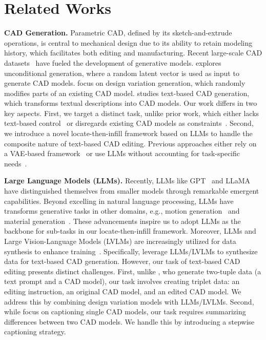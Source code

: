 \section{Related Works}
\label{related_work}  
\noindent\textbf{CAD Generation.}  
Parametric CAD, defined by its sketch-and-extrude operations, is central to mechanical design due to its ability to retain modeling history, which facilitates both editing and manufacturing. 
Recent large-scale CAD datasets~\citep{wu2021deepcad} have fueled the development of generative models.
\citet{wu2021deepcad} explores unconditional generation, where a random latent vector is used as input to generate CAD models. 
\citet{xu2022skexgen, xu2023hierarchical, zhang2024flexcad} focus on design variation generation, which randomly modifies parts of an existing CAD model. 
\citet{khan2024cad} studies text-based CAD generation, which transforms textual descriptions into CAD models.
Our work differs in two key aspects.
First, we target a distinct task, unlike prior work, which either lacks text-based control~\citep{wu2021deepcad, xu2022skexgen, xu2023hierarchical, zhang2024flexcad} or disregards existing CAD models as constraints~\citep{khan2024cad}.
Second, we introduce a novel locate-then-infill framework based on LLMs to handle the composite nature of text-based CAD editing.
Previous approaches either rely on a VAE-based framework~\citep{wu2021deepcad, xu2022skexgen, xu2023hierarchical} or use LLMs without accounting for task-specific needs~\citep{zhang2024flexcad,khan2024cad}.


\noindent\textbf{Large Language Models (LLMs).} 
Recently, LLMs like GPT~\citep{achiam2023gpt, OpenAI2023} and LLaMA~\citep{touvron2023llama} have distinguished themselves from smaller models through remarkable emergent capabilities. 
Beyond excelling in natural language processing, LLMs have transforms generative tasks in other domains, e.g., motion generation~\citep{zhang2024motiongpt} and material generation~\citep{gruverfine}. 
These advancements inspire us to adopt LLMs as the backbone for sub-tasks in our locate-then-infill framework.
Moreover, LLMs and Large Vision-Language Models (LVLMs) are increasingly utilized for data synthesis to enhance training~\citep{xu2024wizardlm, yumetamath}. 
Specifically, \citet{khantext2cad} leverage LLMs/LVLMs to synthesize data for text-based CAD generation. 
However, our task of text-based CAD editing presents distinct challenges.
First, unlike \citet{khan2024cad}, who generate two-tuple data (a text prompt and a CAD model), our task involves creating triplet data: an editing instruction, an original CAD model, and an edited CAD model. 
We address this by combining design variation models with LLMs/LVLMs.
Second, while \citet{khan2024cad} focus on captioning single CAD models, our task requires summarizing differences between two CAD models. 
We handle this by introducing a stepwise captioning strategy.


